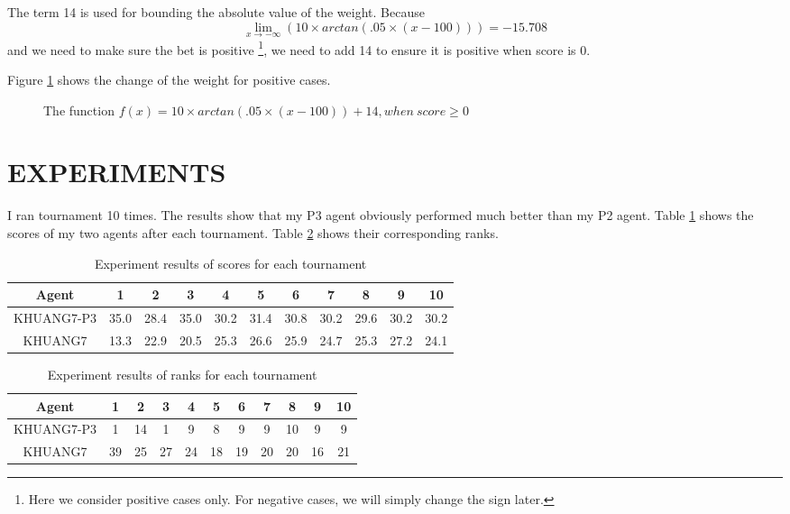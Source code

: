 \documentclass[10pt]{article}
\begin{document}
The term 14 is used for bounding the absolute value of the weight. Because 
$$
\lim_{x \to -\infty} (10\times arctan(.05\times (x - 100))) = -15.708
$$ and we need to make sure the bet is positive \footnote{Here we consider positive cases only. For negative cases, we will simply change the sign later.}, we need to add 14 to ensure it is positive when score is 0.

Figure \ref{figure:a} shows the change of the weight for positive cases.

\begin{figure}
\centering
{}
\caption{The function $f(x)=10\times arctan(.05\times (x - 100)) + 14, when\ score\geq 0$}
\label{figure:a}
\end{figure}

\section{EXPERIMENTS}
I ran tournament 10 times. The results show that my P3 agent obviously performed much better than my P2 agent. Table \ref{tab:res1} shows the scores of my two agents after each tournament. Table \ref{tab:res2} shows their corresponding ranks.

\begin{table}
\caption{Experiment results of scores for each tournament}
\label{tab:res1}
\center
\begin{tabular}{ c c c c c c c c c c c } \hline
Agent		&1		&2		&3		&4		&5		&6		&7		&8		&9		&10\\ \hline
KHUANG7-P3	&35.0	&28.4	&35.0	&30.2	&31.4	&30.8	&30.2	&29.6	&30.2	&30.2 \\
KHUANG7		&13.3	&22.9	&20.5	&25.3	&26.6	&25.9	&24.7	&25.3	&27.2	&24.1 \\ \hline
\end{tabular}
\end{table}

\begin{table}
\caption{Experiment results of ranks for each tournament}
\label{tab:res2}
\center
\begin{tabular}{ c c c c c c c c c c c } \hline
Agent		&1		&2		&3		&4		&5		&6		&7		&8		&9		&10\\ \hline
KHUANG7-P3		&1		&14		&1		&9		&8		&9		&9		&10		&9		&9\\
KHUANG7	&39		&25		&27		&24		&18		&19		&20		&20		&16		&21\\ \hline
\end{tabular}
\end{table}
\end{document}

